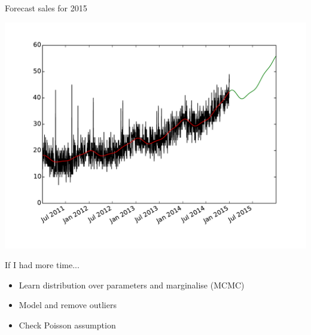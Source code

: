 \documentclass{beamer}
\begin{document}
\begin{frame}{Forecast sales for 2015}
 \begin{center}
  \includegraphics[width=0.8\columnwidth]{modelled.pdf}
 \end{center}
\end{frame}

\begin{frame}{If I had more time...}
 \begin{itemize}
  \item Learn distribution over parameters and marginalise (MCMC)
  \item Model and remove outliers
  \item Check Poisson assumption
 \end{itemize}
\end{frame}

\begin{frame}
\end{frame}
\end{document}
